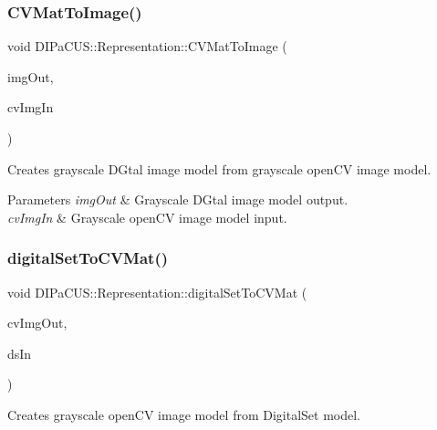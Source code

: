\subsubsection{\texorpdfstring{C\+V\+Mat\+To\+Image()}{CVMatToImage()}}
{\footnotesize\ttfamily void D\+I\+Pa\+C\+U\+S\+::\+Representation\+::\+C\+V\+Mat\+To\+Image (\begin{DoxyParamCaption}\item[{\mbox{\hyperlink{namespaceDIPaCUS_1_1Representation_ae97917e89f57298fda1626daad9f1733}{Image2D}} \&}]{img\+Out,  }\item[{const cv\+::\+Mat \&}]{cv\+Img\+In }\end{DoxyParamCaption})}



Creates grayscale D\+Gtal image model from grayscale open\+CV image model. 


\begin{DoxyParams}{Parameters}
{\em img\+Out} & Grayscale D\+Gtal image model output. \\
\hline
{\em cv\+Img\+In} & Grayscale open\+CV image model input. \\
\hline
\end{DoxyParams}
\mbox{\label{namespaceDIPaCUS_1_1Representation_ad8ad6c44d5f4a4f7033fac84899bb3fa}} 
\subsubsection{\texorpdfstring{digital\+Set\+To\+C\+V\+Mat()}{digitalSetToCVMat()}}
{\footnotesize\ttfamily void D\+I\+Pa\+C\+U\+S\+::\+Representation\+::digital\+Set\+To\+C\+V\+Mat (\begin{DoxyParamCaption}\item[{cv\+::\+Mat \&}]{cv\+Img\+Out,  }\item[{const \mbox{\hyperlink{namespaceDIPaCUS_1_1Representation_a6eca0b4fa262f2d600f11d82ee10b5a6}{Digital\+Set}} \&}]{ds\+In }\end{DoxyParamCaption})}



Creates grayscale open\+CV image model from Digital\+Set model. 


